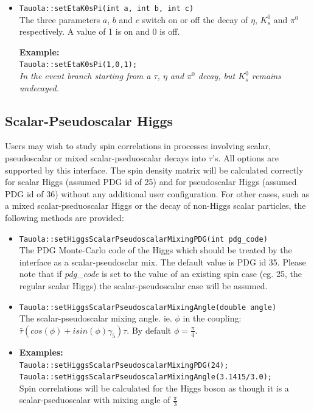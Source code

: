 \documentclass[]{Tauola_interface_design}
\begin{document}
\begin{itemize}
 \item {\tt Tauola::setEtaK0sPi(int a, int b, int c) } \hfill \\ The
   three parameters $a$, $b$ and $c$ switch on or off the decay of
   $\eta$, $K_s^0$ and $\pi^0$ respectively. A value of 1 is on and 0 is off.

\noindent
\textbf{Example:} \hfill \\
  {\tt Tauola::setEtaK0sPi(1,0,1); } \\
\emph{In the event branch starting from a $\tau$, $\eta$ and $\pi^0$ decay, 
but $K_s^0$ remains undecayed.
 } \hfill \\
\end{itemize}
 

\subsection{Scalar-Pseudoscalar Higgs}
Users may wish to study spin correlations in processes involving scalar, pseudoscalar
or mixed scalar-pseduoscalar decays into $\tau$'s. All
options are supported by this interface.
The spin density matrix will be calculated correctly for scalar Higgs
(assumed PDG id of 25) and for pseudoscalar Higgs (assumed PDG id of 36)
without any additional user configuration. For other cases, such as a mixed 
scalar-pseduoscalar Higgs or the decay of non-Higgs scalar particles, 
the following methods are provided:

\begin{itemize}
\item {\tt Tauola::setHiggsScalarPseudoscalarMixingPDG(int pdg\_code)} \hfill \\
The PDG Monte-Carlo code of the Higgs which should be treated by the interface as
a scalar-pseudosclar mix. The default value is PDG id 35. Please note that if
\emph{pdg\_code} is set to the value of an existing spin case (eg. 25, the 
regular scalar Higgs) the scalar-pseudoscalar case will be assumed.
\item {\tt Tauola::setHiggsScalarPseudoscalarMixingAngle(double angle)} \hfill \\
The scalar-pseudoscalar mixing angle. ie. $\phi$ in the coupling: 
$\bar{\tau}(cos(\phi)+isin(\phi)\gamma_5)\tau$. By default $\phi=\frac{\pi}{4}$.
\item 
 \textbf{Examples:} \hfill \\
  {\tt Tauola::setHiggsScalarPseudoscalarMixingPDG(24); } \\
  {\tt Tauola::setHiggsScalarPseudoscalarMixingAngle(3.1415/3.0); } \\
  {Spin correlations will be calculated for the Higgs boson as though it is a scalar-pseduoscalar with mixing angle of $\frac{\pi}{3}$} \hfill \\
\end{itemize}
\end{document}
